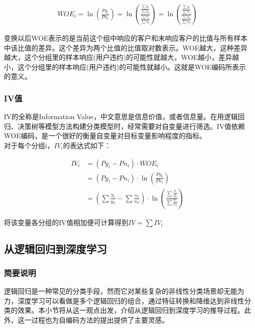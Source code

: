 \begin{equation}
    \begin{aligned}
        WOE_i = \ln(\frac{Py_i}{Pn_i})=\ln(\frac{\frac{\sum y_i}{\sum y_T}}{\frac{\sum n_i}{\sum n_T}})=\ln(\frac{\frac{\sum y_i}{\sum n_i}}{\frac{\sum y_T}{\sum n_T}})
    \end{aligned}
\end{equation}

变换以后WOE表示的是当前这个组中响应的客户和未响应客户的比值与所有样本中该比值的差异。这个差异为两个比值的比值取对数表示。WOE越大，这种差异越大，这个分组里的样本响应(用户违约)的可能性就越大，WOE越小，差异越小，这个分组里的样本响应(用户违约)的可能性就越小。这就是WOE编码所表示的意义。

\subsubsection{IV值}

IV的全称是Information Value，中文意思是信息价值，或者信息量。在用逻辑回归、决策树等模型方法构建分类模型时，经常需要对自变量进行筛选。IV值依赖WOE编码，是一个很好的衡量自变量对目标变量影响程度的指标。\\

对于每个分组i，$IV_i$的表达式如下：

\begin{equation}
    \begin{aligned}
        IV_i & = (Py_i-Pn_i)\cdot WOE_i                                                                                  \\
             & = (Py_i - Pn_i)\cdot \ln(\frac{Py_i}{Pn_i})                                                               \\
             & =(\sum \frac{y_i}{y_T}-\sum \frac{n_i}{n_T}) \cdot \ln(\frac{\sum \frac{y_i}{y_T}}{\sum \frac{n_i}{n_T}})
    \end{aligned}
\end{equation}


将该变量各分组的IV值相加便可计算得到$IV=\sum IV_i$

\subsection{从逻辑回归到深度学习}
\subsubsection{简要说明}
逻辑回归是一种常见的分类手段，然而它对某些复杂的非线性分类场景却无能为力，深度学习可以看做是多个逻辑回归的组合，通过特征转换和降维达到非线性分类的效果。本小节将从这一观点出发，介绍从逻辑回归到深度学习的推导过程。此外，这一过程也为自编码方法的提出提供了主要灵感。

